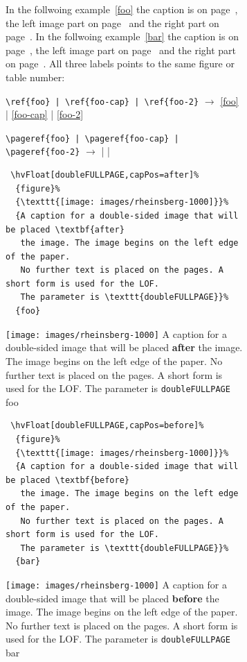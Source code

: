 \documentclass[twoside,paper=a4,usegeometry]{scrartcl}
\makeatletter
\let\hvBlindtext\Blindtext
\def\Blindtext{\par\color{black!40}\hvBlindtext\par\normalcolor}
\def\hvblindtext{\textcolor{black!40}{\blindtext@text}}
\makeatother
\begin{document}
\begin{figure}[p]
\begin{figure}[p]
In the follwoing example~\ref{foo} the caption is on page~\pageref{foo-cap}, the left image part on 
page~\pageref{foo}
and the right part on page~\pageref{foo-2}. In the follwoing example~\ref{bar} the caption is on page~\pageref{bar-cap}, the left image part on page~\pageref{bar}
and the right part on page~\pageref{bar-2}. All three labels points to the same figure or table number:

\verb/\ref{foo} | \ref{foo-cap} | \ref{foo-2}/ $\rightarrow$ \ref{foo} | \ref{foo-cap} | \ref{foo-2}

\verb/\pageref{foo} | \pageref{foo-cap} | \pageref{foo-2}/ $\rightarrow$ \pageref{foo} | \pageref{foo-cap} | \pageref{foo-2}

\begin{lstlisting}
 \hvFloat[doubleFULLPAGE,capPos=after]%
  {figure}%
  {\texttt{[image: images/rheinsberg-1000]}}%
  {A caption for a double-sided image that will be placed \textbf{after} 
   the image. The image begins on the left edge of the paper. 
   No further text is placed on the pages. A short form is used for the LOF. 
   The parameter is \texttt{doubleFULLPAGE}}%
  {foo}
\end{lstlisting}

\hvFloatSetDefaults

  {\texttt{[image: images/rheinsberg-1000]}}%
  {A caption for a double-sided image that will be placed \textbf{after}
   the image. The image begins on the left edge of the paper. 
   No further text is placed on the pages. A short form is used for the LOF. 
   The parameter is \texttt{doubleFULLPAGE}}%
  {foo}

\Blindtext %

\hvblindtext

\hvblindtext

\Blindtext

\Blindtext

\begin{lstlisting}
 \hvFloat[doubleFULLPAGE,capPos=before]%
  {figure}%
  {\texttt{[image: images/rheinsberg-1000]}}%
  {A caption for a double-sided image that will be placed \textbf{before} 
   the image. The image begins on the left edge of the paper. 
   No further text is placed on the pages. A short form is used for the LOF. 
   The parameter is \texttt{doubleFULLPAGE}}%
  {bar}
\end{lstlisting}

  {\texttt{[image: images/rheinsberg-1000]}}%
  {A caption for a double-sided image that will be placed \textbf{before}
   the image. The image begins on the left edge of the paper. 
   No further text is placed on the pages. A short form is used for the LOF. 
   The parameter is \texttt{doubleFULLPAGE}}%
  {bar}


\end{figure}
\end{figure}
\end{document}
